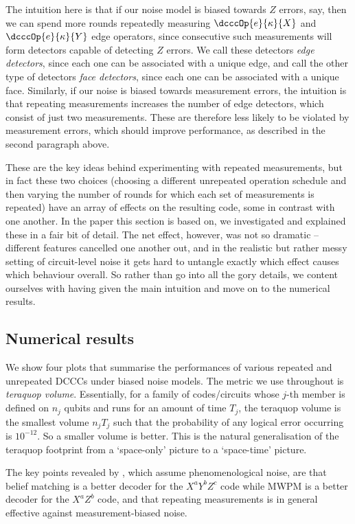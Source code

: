 The intuition here is that if our noise model is biased towards $Z$ errors, say, then we can spend more rounds repeatedly measuring $\dcccOp{e}{\kappa}{X}$ and $\dcccOp{e}{\kappa}{Y}$ edge operators, since consecutive such measurements will form detectors capable of detecting $Z$ errors.
We call these detectors \textit{edge detectors}, since each one can be associated with a unique edge, and call the other type of detectors \textit{face detectors}, since each one can be associated with a unique face.
Similarly, if our noise is biased towards measurement errors, the intuition is that repeating measurements increases the number of edge detectors, which consist of just two measurements.
These are therefore less likely to be violated by measurement errors, which should improve performance, as described in the second paragraph above.

These are the key ideas behind experimenting with repeated measurements, but in fact these two choices (choosing a different unrepeated operation schedule and then varying the number of rounds for which each set of measurements is repeated) have an array of effects on the resulting code, some in contrast with one another.
In the paper this section is based on, we investigated and explained these in a fair bit of detail.
The net effect, however, was not so dramatic -- different features cancelled one another out, and in the realistic but rather messy setting of circuit-level noise it gets hard to untangle exactly which effect causes which behaviour overall.
So rather than go into all the gory details, we content ourselves with having given the main intuition and move on to the numerical results.

\subsection{Numerical results}

We show four plots that summarise the performances of various repeated and unrepeated DCCCs under biased noise models.
The metric we use throughout is \textit{teraquop volume}.
Essentially, for a family of codes/circuits whose $j$-th member is defined on $n_j$ qubits and runs for an amount of time $T_j$, the teraquop volume is the smallest volume $n_j T_j$ such that the probability of any logical error occurring is $10^{-12}$.
So a smaller volume is better.
This is the natural generalisation of the teraquop footprint from a `space-only' picture to a `space-time' picture.

The key points revealed by , which assume phenomenological noise, are that belief matching is a better decoder for the $X^a Y^b Z^c$ code while MWPM is a better decoder for the $X^a Z^b$ code, and that repeating measurements is in general effective against measurement-biased noise.


